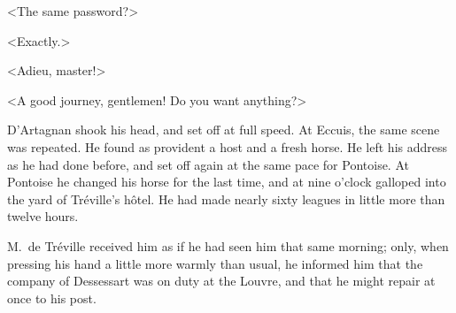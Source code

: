 <The same password?> 

<Exactly.> 

<Adieu, master!> 

<A good journey, gentlemen! Do you want anything?> 

D'Artagnan shook his head, and set off at full speed. At Eccuis, the same scene was repeated. He found as provident a host and a fresh horse. He left his address as he had done before, and set off again at the same pace for Pontoise. At Pontoise he changed his horse for the last time, and at nine o'clock galloped into the yard of Tréville's hôtel. He had made nearly sixty leagues in little more than twelve hours. 

M.~de Tréville received him as if he had seen him that same morning; only, when pressing his hand a little more warmly than usual, he informed him that the company of Dessessart was on duty at the Louvre, and that he might repair at once to his post. 